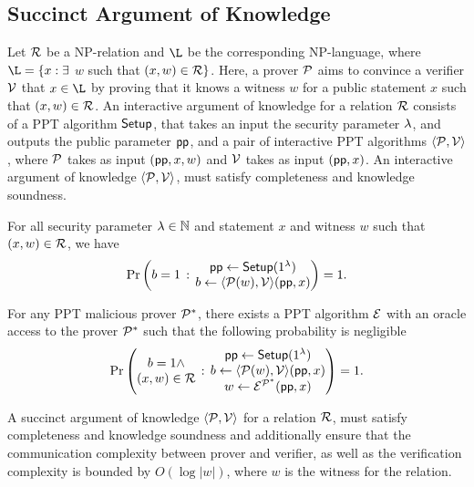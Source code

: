 \subsection{Succinct Argument of Knowledge}
\label{sec:aok}

Let $\mathcal{R}$ be a NP-relation and $\L$ be the corresponding NP-language, where $\L=\{x : \exists$ $w$ such that $(x,w) \in \mathcal{R}\}$. Here, a prover $\mathcal{P}$ aims to convince a verifier $\mathcal{V}$ that $x\in \L$ by proving that it knows a witness $w$ for a public statement $x$ such that $(x,w)\in \mathcal{R}$. An interactive argument of knowledge for a relation $\mathcal{R}$ consists of a PPT algorithm $\mathsf{Setup}$, that takes an input the security parameter $\lambda$, and outputs the public parameter $\mathsf{pp}$, and a pair of interactive PPT algorithms $\langle\mathcal{P},\mathcal{V}\rangle$, where $\mathcal{P}$ takes as input $(\mathsf{pp},x,w)$ and $\mathcal{V}$ takes as input $(\mathsf{pp},x)$. An interactive argument of knowledge  $\langle\mathcal{P},\mathcal{V}\rangle$, must satisfy completeness and knowledge soundness. %

\begin{definition}[Completeness]
	\label{def:aok-comp}
	For all security parameter $\lambda \in \mathbb{N}$ and statement $x$ and witness $w$ such that $(x,w)\in \mathcal{R}$, we have
	\[
	\Pr \left( 
	\begin{matrix}
		b=1
	\end{matrix}
	\,:\,
	\begin{matrix}
		\mathsf{pp} \leftarrow \mathsf{Setup}(1^{\lambda}) \\
		b \leftarrow \langle\mathcal{P} (w) ,\mathcal{V}\rangle (\mathsf{pp},x)
	\end{matrix}
	\right) = 1.
	\]
\end{definition}

\begin{definition}
	\label{def:aok-ks}
	For any PPT malicious prover $\mathcal{P}^*$, there exists a PPT algorithm $\mathcal{E}$ with an oracle access to the prover $\mathcal{P}^*$ such that the following probability is negligible
	\[
		\Pr \left( 
		\begin{matrix}
			b=1 \wedge \\
			(x,w)\in \mathcal{R}
		\end{matrix}
		\,:\,
		\begin{matrix}
			\mathsf{pp} \leftarrow \mathsf{Setup}(1^{\lambda}) \\
			b \leftarrow \langle\mathcal{P} (w) ,\mathcal{V}\rangle (\mathsf{pp},x) \\
			w \leftarrow \mathcal{E}^{\mathcal{P}^*} (\mathsf{pp},x)
		\end{matrix}
		\right) = 1.
		\]	
\end{definition}

A succinct argument of knowledge $\langle\mathcal{P},\mathcal{V}\rangle$ for a relation $\mathcal{R}$, must satisfy completeness and knowledge soundness and additionally ensure that the communication complexity between prover and verifier, as well as the verification complexity is bounded by $O(\log |w|)$, where $w$ is the witness for the relation.


